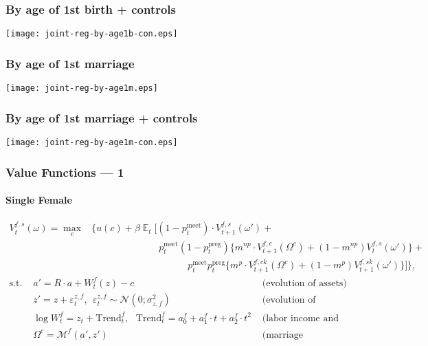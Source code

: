 \documentclass{beamer}
\DeclareMathOperator{\E}{\mathbb{E}}
\begin{document}
\begin{frame}[label=age1b-con]
\frametitle{By age of 1st birth + controls}
\begin{center}
\texttt{[image: joint-reg-by-age1b-con.eps]}
\end{center}
\hyperlink{table-ACS}{}
\end{frame}


\begin{frame}[label=age1m]
\frametitle{By age of 1st marriage}
\begin{center}
\texttt{[image: joint-reg-by-age1m.eps]}
\end{center}
\hyperlink{age1m-con}{}
\hyperlink{table-ACS}{}
\end{frame}

\begin{frame}[label=age1m-con]
\frametitle{By age of 1st marriage + controls}
\begin{center}
\texttt{[image: joint-reg-by-age1m-con.eps]}
\end{center}
\hyperlink{table-ACS}{}
\end{frame}





\begin{frame}[label=value-functions]
\frametitle{Value Functions --- 1}
\framesubtitle{Single Female}
{\scriptsize
\begin{align}V^{f,s}_t(\omega) = \max\limits_{c} & \bigg\{ u(c) + \beta \E_t \Big[ (1 - p^{\text{meet}}_t)\cdot V^{f,s}_{t+1}(\omega') + \nonumber \\  \nonumber
& \hspace{7em} p^{\text{meet}}_t (1-p^{\text{preg}}_t) \big\{ m^{np} \cdot V^{f,c}_{t+1}(\Omega^c) + (1-m^{np})V^{f,s}_t(\omega')\big\} + \\  \nonumber
& \hspace{10em} p^{\text{meet}}_t p^{\text{preg}}_t \big\{ m^{p} \cdot V^{f,ck}_{t+1}(\Omega^c) + (1-m^{p})V^{f,sk}_{t+1}(\omega')\big\}  \Big]  \bigg\},
\end{align}\vspace{-3em}
\begin{align*}
 \text{s.t. \ }  &  a' = R\cdot a  + W^f_t(z) - c  & \text{ (evolution of assets)}\\
 &  z' = z + \varepsilon^{z,f}_t, \ \ \varepsilon^{z,f}_t \sim \mathcal{N}(0;\sigma_{z,f}^2) &  \text{ (evolution of productivity)}\\
  & \log W^f_t = z_t + \text{Trend}^f_t, \ \ \  \text{Trend}^f_t = a^f_0 + a^f_1\cdot t  +  a^f_2 \cdot t^2 &  \text{ (labor income and trend)}\\
  & \Omega^c = \mathcal{M}^f(a',z') &  \text{ (marriage prospectives)}
\end{align*}
}
\hyperlink{utilities}{}
\end{frame}
\end{document}
